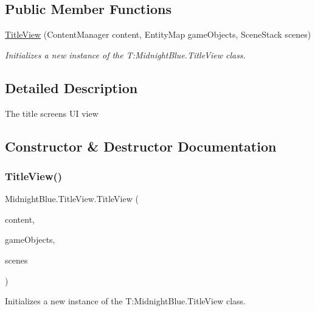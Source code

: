 \subsection*{Public Member Functions}
\begin{DoxyCompactItemize}
\item 
\hyperlink{class_midnight_blue_1_1_title_view_ae4322373616e1100eda699d87ee63ff7}{Title\+View} (Content\+Manager content, Entity\+Map game\+Objects, Scene\+Stack scenes)
\begin{DoxyCompactList}\small\item\em Initializes a new instance of the T\+:\+Midnight\+Blue.\+Title\+View class. \end{DoxyCompactList}\end{DoxyCompactItemize}


\subsection{Detailed Description}
The title screens UI view 



\subsection{Constructor \& Destructor Documentation}
\hypertarget{class_midnight_blue_1_1_title_view_ae4322373616e1100eda699d87ee63ff7}{}\label{class_midnight_blue_1_1_title_view_ae4322373616e1100eda699d87ee63ff7} 
\subsubsection{\texorpdfstring{Title\+View()}{TitleView()}}
{\footnotesize\ttfamily Midnight\+Blue.\+Title\+View.\+Title\+View (\begin{DoxyParamCaption}\item[{Content\+Manager}]{content,  }\item[{Entity\+Map}]{game\+Objects,  }\item[{Scene\+Stack}]{scenes }\end{DoxyParamCaption})\hspace{0.3cm}{\ttfamily [inline]}}



Initializes a new instance of the T\+:\+Midnight\+Blue.\+Title\+View class. 


